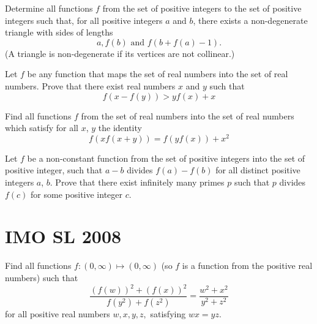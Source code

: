 \documentclass[11pt]{scrartcl}
\begin{document}
\begin{Problem}
Determine all functions $ f$ from the set of positive integers to the set of positive integers such that, for all positive integers $ a$ and $ b$, there exists a non-degenerate triangle with sides of lengths
\[ a, f(b) \text{ and } f(b + f(a) - 1).\]
(A triangle is non-degenerate if its vertices are not collinear.)
\end{Problem}

\begin{Problem}
Let $f$ be any function that maps the set of real numbers into the set of real numbers. Prove that there exist real numbers $x$ and $y$ such that\[f\left(x-f(y)\right)>yf(x)+x\]
\end{Problem}


\begin{Problem}
Find all functions $f$ from the set of real numbers into the set of real numbers which satisfy for all $x$, $y$ the identity\[ f\left(xf(x+y)\right) = f\left(yf(x)\right) +x^2\]
\end{Problem}


\begin{Problem}
Let $f$ be a non-constant function from the set of positive integers into the set of positive integer, such that $a-b$ divides $f(a)-f(b)$ for all distinct positive integers $a$, $b$. Prove that there exist infinitely many primes $p$ such that $p$ divides $f(c)$ for some positive integer $c$.
\end{Problem}


\section{IMO SL 2008}

\begin{Problem}
Find all functions $ f: (0, \infty) \mapsto (0, \infty)$ (so $ f$ is a function from the positive real numbers) such that
\[ \frac {\left( f(w) \right)^2 + \left( f(x) \right)^2}{f(y^2) + f(z^2) } = \frac {w^2 + x^2}{y^2 + z^2}
\]
for all positive real numbers $ w,x,y,z,$ satisfying $ wx = yz.$
\end{Problem}
\end{document}
